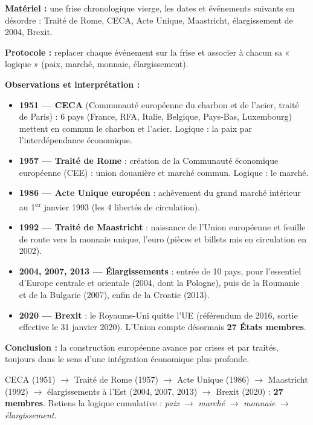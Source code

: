 \documentclass[11pt]{article}
\newcommand{\cle}[1]{{\popxbold\color{popdark}#1}}
\begin{document}
\begin{experience}
\textbf{Matériel :} une frise chronologique vierge, les dates et événements suivants en désordre : Traité de Rome, CECA, Acte Unique, Maastricht, élargissement de 2004, Brexit.\par
\textbf{Protocole :} replacer chaque événement sur la frise et associer à chacun sa « logique » (paix, marché, monnaie, élargissement).\par
\textbf{Observations et interprétation :}
\begin{itemize}
\item \textbf{1951 — CECA} (Communauté européenne du charbon et de l'acier, traité de Paris) : 6 pays (France, RFA, Italie, Belgique, Pays-Bas, Luxembourg) mettent en commun le charbon et l'acier. Logique : la \cle{paix} par l'interdépendance économique.
\item \textbf{1957 — Traité de Rome} : création de la Communauté économique européenne (CEE) : union douanière et marché commun. Logique : le \cle{marché}.
\item \textbf{1986 — Acte Unique européen} : achèvement du grand marché intérieur au 1\textsuperscript{er} janvier 1993 (les 4 libertés de circulation).
\item \textbf{1992 — Traité de Maastricht} : naissance de l'Union européenne et feuille de route vers la monnaie unique, l'\cle{euro} (pièces et billets mis en circulation en 2002).
\item \textbf{2004, 2007, 2013 — Élargissements} : entrée de 10 pays, pour l'essentiel d'Europe centrale et orientale (2004, dont la Pologne), puis de la Roumanie et de la Bulgarie (2007), enfin de la Croatie (2013).
\item \textbf{2020 — Brexit} : le Royaume-Uni quitte l'UE (référendum de 2016, sortie effective le 31 janvier 2020). L'Union compte désormais \textbf{27 États membres}.
\end{itemize}
\textbf{Conclusion :} la construction européenne avance par crises et par traités, toujours dans le sens d'une intégration économique plus profonde.
\end{experience}

\begin{aretenir}
CECA (1951) $\rightarrow$ Traité de Rome (1957) $\rightarrow$ Acte Unique (1986) $\rightarrow$ Maastricht (1992) $\rightarrow$ élargissements à l'Est (2004, 2007, 2013) $\rightarrow$ Brexit (2020) : \textbf{27 membres}. Retiens la logique cumulative : \emph{paix} $\rightarrow$ \emph{marché} $\rightarrow$ \emph{monnaie} $\rightarrow$ \emph{élargissement}.
\end{aretenir}
\end{document}
